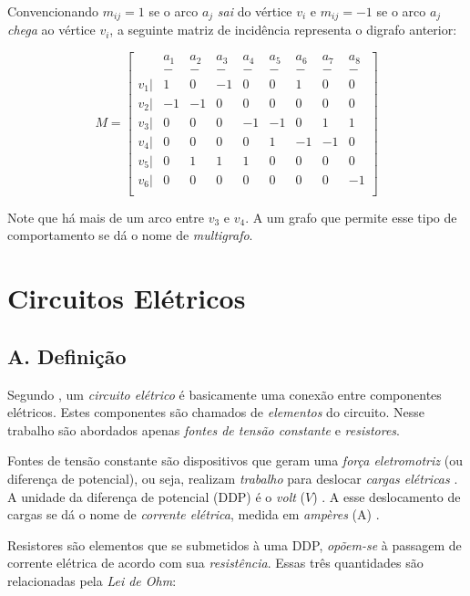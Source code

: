 \documentclass[twocolumn, 10pt,a4paper]{extarticle}
\begin{document}
Convencionando $m_{ij} = 1$ se o arco $a_j$ \textit{sai} do vértice $v_i$ e $m_{ij} = -1$ se o arco $a_j$ \textit{chega} ao vértice $v_i$, a seguinte matriz de incidência representa o digrafo anterior:

\[
M = 
\left[
\begin{smallmatrix}
 & a_1 & a_2 & a_3 & a_4 & a_5 & a_6 & a_7 & a_8 \\
 & - & - & - & - & - & - & - & - \\
 v_1 |& 1 & 0 & -1 & 0 & 0 & 1 & 0 & 0\\
 v_2 |& -1 & -1 & 0 & 0 & 0 & 0 & 0 & 0\\
 v_3 |& 0 & 0 & 0 & -1 & -1 & 0 & 1 & 1\\
 v_4 |& 0 & 0 & 0 & 0 & 1 & -1 & -1 & 0\\
 v_5 |& 0 & 1 & 1 & 1 & 0 & 0 & 0 & 0\\
 v_6 |& 0 & 0 & 0 & 0 & 0 & 0 & 0 & -1\\
  &  &  &  &  &  & &  & 
\end{smallmatrix}\right]
\]

Note que há mais de um arco entre $v_3$ e $v_4$. A um grafo que permite esse tipo de comportamento se dá o nome de \textit{multigrafo}. 

\section{Circuitos Elétricos}

\subsection*{A. \quad Definição}

Segundo \cite[p. 4]{sadiku}, um \textit{circuito elétrico} é basicamente uma conexão entre componentes elétricos. Estes componentes são chamados de \textit{elementos} do circuito. Nesse trabalho são abordados apenas \textit{fontes de tensão constante} e \textit{resistores}.

Fontes de tensão constante são dispositivos que geram uma \textit{força eletromotriz} (ou diferença de potencial), ou seja, realizam \textit{trabalho} para deslocar \textit{cargas elétricas} \cite[p. 8]{sadiku}. A unidade da diferença de potencial (DDP) é o \textit{volt} ($V$) \cite[p. 9]{sadiku}. A esse deslocamento de cargas se dá o nome de \textit{corrente elétrica}, medida em \textit{ampères} (A) \cite[p. 6]{sadiku}.

Resistores são elementos que se submetidos à uma DDP, \textit{opõem-se} à passagem de corrente elétrica \cite[p. 28]{sadiku} de acordo com sua \textit{resistência}. Essas três quantidades são relacionadas pela \textit{Lei de Ohm}:
\end{document}
